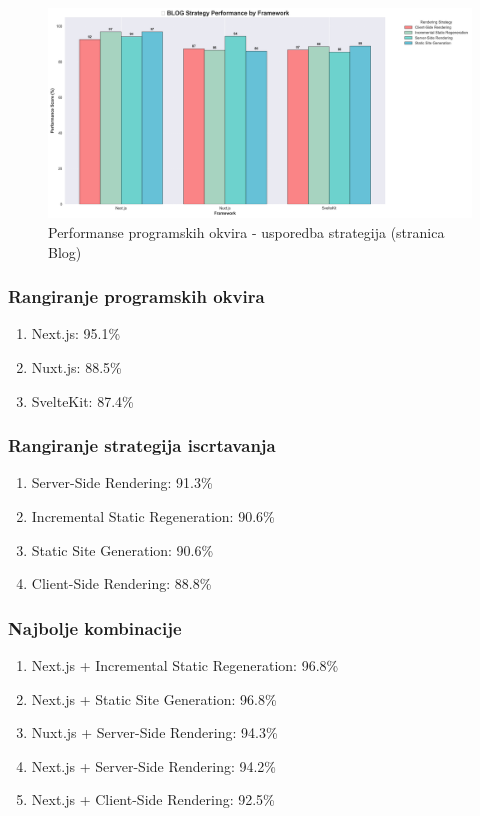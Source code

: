 \begin{figure}[H]
    \centering
    \includegraphics[width=\textwidth]{slike/rezultati/blog/blog_strategy_comparison.png}
    \caption{Performanse programskih okvira - usporedba strategija (stranica Blog)}
    \label{fig:testiranje-blog-usporedba-strategija}
\end{figure}

\newpage

\subsubsection{Rangiranje programskih okvira}
\begin{enumerate}
    \item Next.js: 95.1\%
    \item Nuxt.js: 88.5\%
    \item SvelteKit: 87.4\%
\end{enumerate}

\subsubsection{Rangiranje strategija iscrtavanja}
\begin{enumerate}
    \item Server-Side Rendering: 91.3\%
    \item Incremental Static Regeneration: 90.6\%
    \item Static Site Generation: 90.6\%
    \item Client-Side Rendering: 88.8\%
\end{enumerate}

\subsubsection{Najbolje kombinacije}
\begin{enumerate}
    \item Next.js + Incremental Static Regeneration: 96.8\%
    \item Next.js + Static Site Generation: 96.8\%
    \item Nuxt.js + Server-Side Rendering: 94.3\%
    \item Next.js + Server-Side Rendering: 94.2\%
    \item Next.js + Client-Side Rendering: 92.5\%
\end{enumerate}

